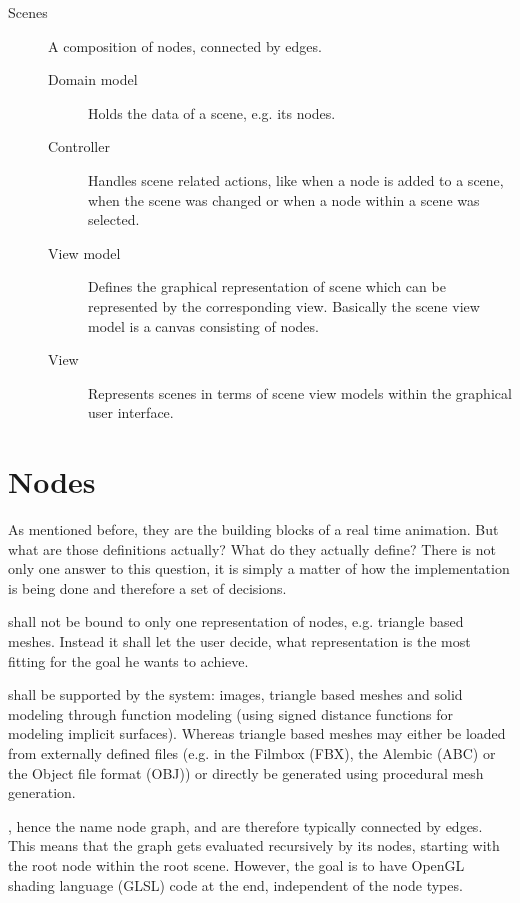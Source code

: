 \documentclass[%
    a4paper,    %
    justified,  %
    nobib,      %
    openany     %
]{tufte-book}
\makeatletter
\renewcommand{\label}[1]{\@tufte@label{##1}}%
\makeatother
\begin{document}
\begin{description}
\item[Scenes] A composition of nodes, connected by edges.
  \begin{description}
    \item[Domain model] Holds the data of a scene, e.g. its nodes.
    \item[Controller]   Handles scene related actions, like when a node is added
                        to a scene, when the scene was changed or when a node
                        within a scene was selected.
    \item[View model]   Defines the graphical representation of scene which can
                        be represented by the corresponding view. Basically the
                        scene view model is a canvas consisting of nodes.
    \item[View]         Represents scenes in terms of scene view models within the
                        graphical user interface.
  \end{description}
\end{description}

\section{Nodes}
\label{appendix:sec:node-grahp:nodes}

 As mentioned before, they are
the building blocks of a real time animation. But what are those definitions
actually? What do they actually define? There is not only one answer to this
question, it is simply a matter of how the implementation is being done and
therefore a set of decisions.

 shall not be bound to only one
representation of nodes, e.g. triangle based meshes. Instead it shall let the
user decide, what representation is the most fitting for the goal he wants to
achieve.

 shall be supported by the
system: images, triangle based meshes and solid modeling through function
modeling (using signed distance functions for modeling implicit surfaces).
Whereas triangle based meshes may either be loaded from externally defined files
(e.g. in the Filmbox (FBX), the Alembic (ABC) or the Object file format (OBJ))
or directly be generated using procedural mesh generation.

, hence the name node graph, and
are therefore typically connected by edges. This means that the graph gets
evaluated recursively by its nodes, starting with the root node within the root
scene. However, the goal is to have OpenGL shading language (GLSL) code at the
end, independent of the node types.
\end{document}
